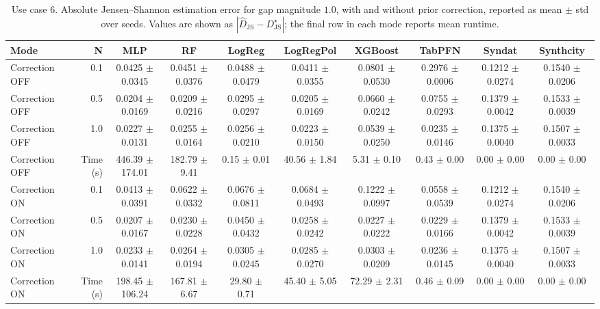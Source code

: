 \begin{table}[ht]
\centering
\scriptsize
\setlength{\tabcolsep}{2.5pt}
\caption{Use case 6. Absolute Jensen--Shannon estimation error for gap magnitude $1.0$, with and without prior correction, reported as mean $\pm$ std over seeds. Values are shown as $|\widehat{D}_{\mathrm{JS}} - D_{\mathrm{JS}}^{\star}|$; the final row in each mode reports mean runtime.}
\label{tab:uc6_gap_1p0_on_off_mean_std_from_seeds}
\begin{tabular}{lrcccccccc}
\toprule
Mode & N & MLP & RF & LogReg & LogRegPol & XGBoost & TabPFN & Syndat & Synthcity \\
\midrule
Correction OFF & 0.1 & 0.0425 $\pm$ 0.0345 & 0.0451 $\pm$ 0.0376 & 0.0488 $\pm$ 0.0479 & 0.0411 $\pm$ 0.0355 & 0.0801 $\pm$ 0.0530 & 0.2976 $\pm$ 0.0006 & 0.1212 $\pm$ 0.0274 & 0.1540 $\pm$ 0.0206 \\
Correction OFF & 0.5 & 0.0204 $\pm$ 0.0169 & 0.0209 $\pm$ 0.0216 & 0.0295 $\pm$ 0.0297 & 0.0205 $\pm$ 0.0169 & 0.0660 $\pm$ 0.0242 & 0.0755 $\pm$ 0.0293 & 0.1379 $\pm$ 0.0042 & 0.1533 $\pm$ 0.0039 \\
Correction OFF & 1.0 & 0.0227 $\pm$ 0.0131 & 0.0255 $\pm$ 0.0164 & 0.0256 $\pm$ 0.0210 & 0.0223 $\pm$ 0.0150 & 0.0539 $\pm$ 0.0250 & 0.0235 $\pm$ 0.0146 & 0.1375 $\pm$ 0.0040 & 0.1507 $\pm$ 0.0033 \\
Correction OFF & Time (s) & 446.39 $\pm$ 174.01 & 182.79 $\pm$ 9.41 & 0.15 $\pm$ 0.01 & 40.56 $\pm$ 1.84 & 5.31 $\pm$ 0.10 & 0.43 $\pm$ 0.00 & 0.00 $\pm$ 0.00 & 0.00 $\pm$ 0.00 \\
Correction ON & 0.1 & 0.0413 $\pm$ 0.0391 & 0.0622 $\pm$ 0.0332 & 0.0676 $\pm$ 0.0811 & 0.0684 $\pm$ 0.0493 & 0.1222 $\pm$ 0.0997 & 0.0558 $\pm$ 0.0539 & 0.1212 $\pm$ 0.0274 & 0.1540 $\pm$ 0.0206 \\
Correction ON & 0.5 & 0.0207 $\pm$ 0.0167 & 0.0230 $\pm$ 0.0228 & 0.0450 $\pm$ 0.0432 & 0.0258 $\pm$ 0.0242 & 0.0227 $\pm$ 0.0222 & 0.0229 $\pm$ 0.0166 & 0.1379 $\pm$ 0.0042 & 0.1533 $\pm$ 0.0039 \\
Correction ON & 1.0 & 0.0233 $\pm$ 0.0141 & 0.0264 $\pm$ 0.0194 & 0.0305 $\pm$ 0.0245 & 0.0285 $\pm$ 0.0270 & 0.0303 $\pm$ 0.0209 & 0.0236 $\pm$ 0.0145 & 0.1375 $\pm$ 0.0040 & 0.1507 $\pm$ 0.0033 \\
Correction ON & Time (s) & 198.45 $\pm$ 106.24 & 167.81 $\pm$ 6.67 & 29.80 $\pm$ 0.71 & 45.40 $\pm$ 5.05 & 72.29 $\pm$ 2.31 & 0.46 $\pm$ 0.09 & 0.00 $\pm$ 0.00 & 0.00 $\pm$ 0.00 \\
\bottomrule
\end{tabular}
\end{table}